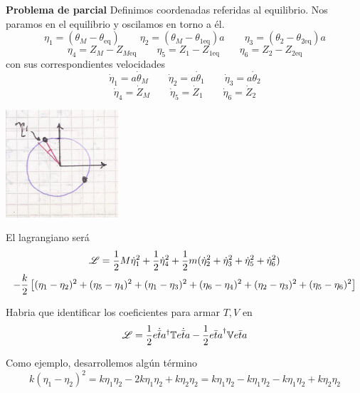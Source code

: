 \documentclass[10pt,oneside]{CBFT_book}
\begin{document}
\begin{ejemplo}{\bf Problema de parcial}
Definimos coordenadas referidas al equilibrio. Nos paramos en el equilibrio y oscilamos en torno a él.
\[
 	\eta_1 = ( \theta_M - \theta_{\mbox{eq}} ) 
 	\qquad 
 	\eta_2 = ( \theta_M - \theta_{ 1 \mbox{eq} } )a 
 	\qquad 
 	\eta_3 = ( \theta_2 - \theta_{ 2 \mbox{eq} } )a
\]
\[
	\eta_4 = Z_M - Z_{M\mbox{eq}} \qquad \eta_5 = Z_1 - Z_{1\mbox{eq}} \qquad \eta_6 = Z_2 - Z_{2\mbox{eq}}
\]
con sus correspondientes velocidades
\[
	\dot{\eta}_1 = a \dot{\theta}_M \qquad \dot{\eta}_2 = a \dot{\theta}_1 \qquad \dot{\eta}_3 = a \dot{\theta}_2
\]
\[
	\dot{\eta}_4 = \dot{Z}_M \qquad \dot{\eta}_5 = \dot{Z}_1 \qquad \dot{\eta}_6 = \dot{Z}_2
\]

\includegraphics[scale=0.5]{images/fig_mc_problema_parcial_osc_3.jpg}

El lagrangiano será 
\begin{multline*}
	\mathscr{L}  =  \frac{1}{2} M \dot{\eta}_1^2 + \frac{1}{2}\dot{\eta}_4^2 + \frac{1}{2} m (\dot{\eta}_2^2 + \dot{\eta}_3^2 + \dot{\eta}_5^2 + \dot{\eta}_6^2 ) \\
	- \frac{k}{2}\left[ (\eta_1 - \eta_2 )^2 + (\eta_5 - \eta_4 )^2 + (\eta_1 - \eta_3 )^2 + (\eta_6 - \eta_4 )^2 + (\eta_2 - \eta_3 )^2 + (\eta_5 - \eta_6 )^2 \right]
\end{multline*}


Habria que identificar los coeficientes para armar $T,V$ en 
\[
	\mathscr{L} = \frac{1}{2} \dot{\bar{eta}}^\dagger \mathbb{T} \dot{\bar{eta}} 
	- \frac{1}{2} \bar{eta}^\dagger \mathbb{V} \bar{eta}
\]

Como ejemplo, desarrollemos algún término
\[
	k(\eta_1 - \eta_2)^2 = k \eta_1 \eta_2 - 2k \eta_1 \eta_2 + k \eta_2 \eta_2 =
	k \eta_1 \eta_2 - k \eta_1 \eta_2 -  k \eta_1 \eta_2 + k \eta_2 \eta_2
\]


\end{ejemplo}
\end{document}
